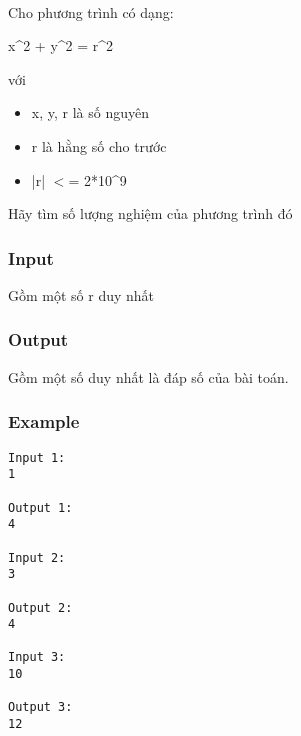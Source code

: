 

 

Cho phương trình có dạng:

x\textasciicircum2 + y\textasciicircum2 = r\textasciicircum2

với
\begin{itemize}
	\item x, y, r là số nguyên
	\item r là hằng số cho trước
	\item |r| $<$= 2*10\textasciicircum9
\end{itemize}

Hãy tìm số lượng nghiệm của phương trình đó

\subsubsection{Input}

Gồm một số r duy nhất

\subsubsection{Output}

Gồm một số duy nhất là đáp số của bài toán.

\subsubsection{Example}
\begin{verbatim}
Input 1:
1

Output 1:
4

Input 2:
3

Output 2:
4

Input 3:
10

Output 3:
12
\end{verbatim}
